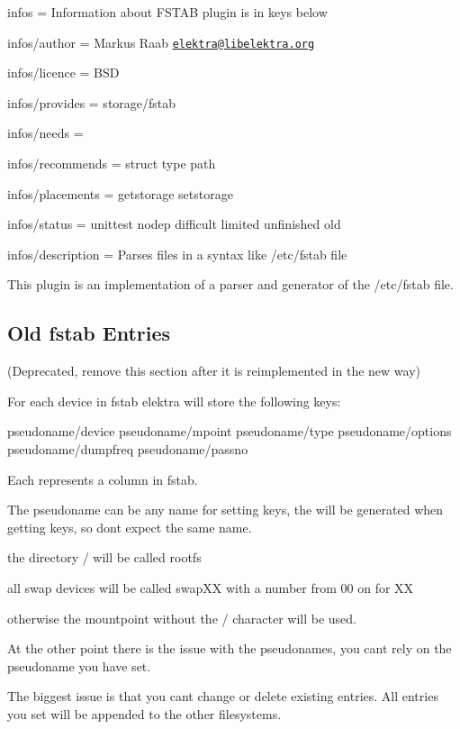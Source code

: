 
\begin{DoxyItemize}
\item infos = Information about F\+S\+T\+AB plugin is in keys below
\item infos/author = Markus Raab \href{mailto:elektra@libelektra.org}{\tt elektra@libelektra.\+org}
\item infos/licence = B\+SD
\item infos/provides = storage/fstab
\item infos/needs =
\item infos/recommends = struct type path
\item infos/placements = getstorage setstorage
\item infos/status = unittest nodep difficult limited unfinished old
\item infos/description = Parses files in a syntax like /etc/fstab file
\end{DoxyItemize}

This plugin is an implementation of a parser and generator of the /etc/fstab file.

\subsection*{Old fstab Entries}

(Deprecated, remove this section after it is reimplemented in the new way)

For each device in fstab elektra will store the following keys\+: \begin{DoxyVerb}pseudoname/device
pseudoname/mpoint
pseudoname/type
pseudoname/options
pseudoname/dumpfreq
pseudoname/passno
\end{DoxyVerb}


Each represents a column in fstab.

The pseudoname can be any name for setting keys, the will be generated when getting keys, so don\textquotesingle{}t expect the same name.

the directory {\ttfamily /} will be called {\ttfamily rootfs}

all swap devices will be called {\ttfamily swap\+XX} with a number from 00 on for XX

otherwise the mountpoint without the \textquotesingle{}/\textquotesingle{} character will be used.

At the other point there is the issue with the pseudonames, you can\textquotesingle{}t rely on the pseudoname you have set.

The biggest issue is that you can\textquotesingle{}t change or delete existing entries. All entries you set will be appended to the other filesystems.

